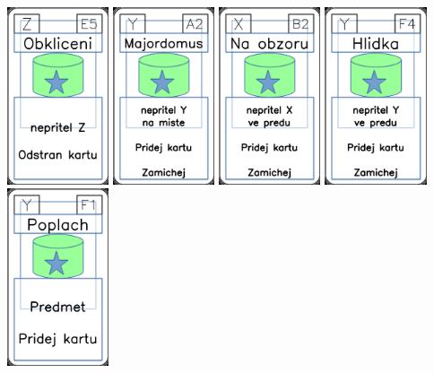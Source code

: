 \documentclass[a4paper]{article}
\begin{document}
	\includegraphics[width=3.0cm]{img-5_54}
	\includegraphics[width=3.0cm]{img-5_31}
	\includegraphics[width=3.0cm]{img-5_6}
	\includegraphics[width=3.0cm]{img-5_28}
	\includegraphics[width=3.0cm]{img-5_25}
\end{document}
